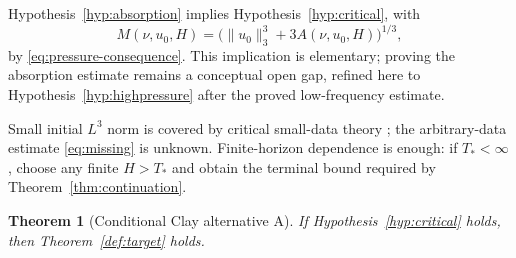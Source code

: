 \documentclass[11pt]{article}
\newtheorem{theorem}{Theorem}[section]
\theoremstyle{definition}
\theoremstyle{plain}
\newcommand{\norm}[1]{\lVert #1\rVert}
\begin{document}
Hypothesis~\ref{hyp:absorption} implies Hypothesis~\ref{hyp:critical}, with
\[
 M(\nu,u_0,H)=
 \bigl(\norm{u_0}_3^3+3A(\nu,u_0,H)\bigr)^{1/3},
\]
by \eqref{eq:pressure-consequence}.  This implication is elementary; proving
the absorption estimate remains a conceptual open gap, refined here to
Hypothesis~\ref{hyp:highpressure} after the proved low-frequency estimate.

Small initial $L^3$ norm is covered by critical small-data theory
\cite{Kato1984}; the arbitrary-data estimate \eqref{eq:missing} is unknown.
Finite-horizon dependence is enough: if $T_*<\infty$, choose any finite
$H>T_*$ and obtain the terminal bound required by
Theorem~\ref{thm:continuation}.

\begin{theorem}[Conditional Clay alternative A]\label{thm:conditional}
If Hypothesis~\ref{hyp:critical} holds, then
Theorem~\ref{def:target} holds.
\end{theorem}
\end{document}

